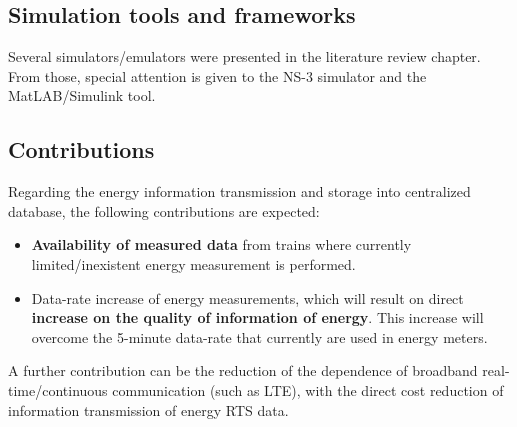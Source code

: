 \subsection{Simulation tools and frameworks}

Several simulators/emulators were presented in the literature review chapter. From those, special attention is given to the NS-3 simulator and the MatLAB/Simulink tool.  


\subsection{Contributions}

Regarding the energy information transmission and storage into centralized database, the following contributions are expected:

\begin{itemize}
	\setlength\itemsep{0em}
	
	\item \textbf{Availability of measured data} from trains where currently limited/inexistent energy measurement is performed.
	
	\item Data-rate increase of energy measurements, which will result on direct \textbf{increase on the quality of information of energy}. This increase will overcome the 5-minute data-rate that currently are used in energy meters.
	
\end{itemize}

A further contribution can be the reduction of the dependence of broadband real-time/continuous communication (such as \ac{LTE}), with the direct cost reduction of information transmission of energy \ac{RTS} data.

	
	
